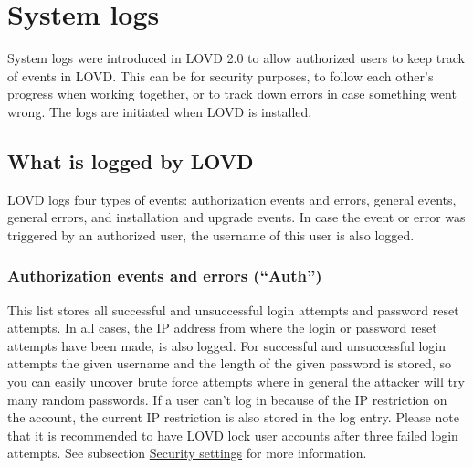 \documentclass[a4paper,oneside,openany,12pt]{memoir}
\renewenvironment{leftbar}[1][\hsize]
{%
    \def\FrameCommand
    {%
        {\color{LOVDdark}\vrule width 3pt \hspace{5pt}}%
        \colorbox{LOVDlight}%
    }%
    \MakeFramed{\hsize#1\advance\hsize-\width\FrameRestore}%
}
{\endMakeFramed}
\begin{document}
\section{System logs}
System logs were introduced in LOVD 2.0 to allow authorized users to keep track of events in LOVD.
This can be for security purposes, to follow each other's progress when working together,
or to track down errors in case something went wrong.
The logs are initiated when LOVD is installed.



\subsection{What is logged by LOVD}
LOVD logs four types of events: authorization events and errors, general events, general errors, and installation and upgrade events.
In case the event or error was triggered by an authorized user, the username of this user is also logged.

\subsubsection{Authorization events and errors (``Auth'')}
This list stores all successful and unsuccessful login attempts and password reset attempts.
In all cases, the IP address from where the login or password reset attempts have been made, is also logged.
For successful and unsuccessful login attempts the given username and the length of the given password is stored,
 so you can easily uncover brute force attempts where in general the attacker will try many random passwords.
If a user can't log in because of the IP restriction on the account, the current IP restriction is also stored in the log entry.
Please note that it is recommended to have LOVD lock user accounts after three failed login attempts.
See subsection \hyperlink{ssec:security_settings}{Security settings} for more information.

\end{document}
